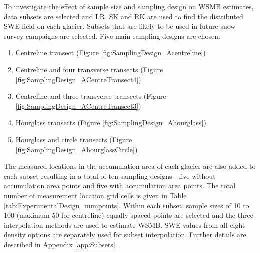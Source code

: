 \documentclass[12pt]{article}
\begin{document}
To investigate the effect of sample size and sampling design on WSMB estimates, data subsets are selected and LR, SK and RK are used to find the distributed SWE field on each glacier. Subsets that are likely to be used in future snow survey campaigns are selected. Five main sampling designs are chosen:
\begin{enumerate}
\item Centreline transect (Figure \ref{fig:SamplingDesign_Acentreline})
\item Centreline and four transverse transects (Figure \ref{fig:SamplingDesign_ACentreTransect4})
\item Centreline and three transverse transects (Figure \ref{fig:SamplingDesign_ACentreTransect3})
\item Hourglass transects (Figure \ref{fig:SamplingDesign_Ahourglass})
\item Hourglass and circle transects (Figure \ref{fig:SamplingDesign_AhourglassCircle})
\end{enumerate}
The measured locations in the accumulation area of each glacier are also added to each subset resulting in a total of ten sampling designs - five without accumulation area points and five with accumulation area points. The total number of measurement location grid cells is given in Table \ref{tab:ExperimentalDesign_numpoints}. Within each subset, sample sizes of 10 to 100 (maximum 50 for centreline) equally spaced points are selected and the three interpolation methods are used to estimate WSMB. SWE values from all eight density options are separately used for subset interpolation. Further details are described in Appendix \ref{app:Subsets}. 
\end{document}

